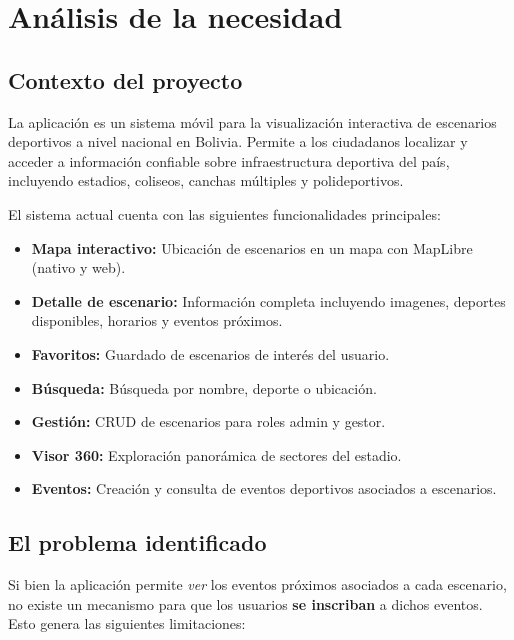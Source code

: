 
\section{An\'alisis de la necesidad}

\subsection{Contexto del proyecto}

La aplicaci\'on \nombreApp{} es un sistema m\'ovil para la
visualizaci\'on interactiva de escenarios deportivos a nivel nacional
en Bolivia. Permite a los ciudadanos localizar y acceder a informaci\'on
confiable sobre infraestructura deportiva del pa\'is, incluyendo
estadios, coliseos, canchas m\'ultiples y polideportivos.

El sistema actual cuenta con las siguientes funcionalidades principales:

\begin{itemize}
  \item \textbf{Mapa interactivo:} Ubicaci\'on de escenarios en un mapa
    con MapLibre (nativo y web).
  \item \textbf{Detalle de escenario:} Informaci\'on completa incluyendo
    imagenes, deportes disponibles, horarios y eventos pr\'oximos.
  \item \textbf{Favoritos:} Guardado de escenarios de inter\'es del
    usuario.
  \item \textbf{B\'usqueda:} B\'usqueda por nombre, deporte o
    ubicaci\'on.
  \item \textbf{Gesti\'on:} CRUD de escenarios para roles admin y gestor.
  \item \textbf{Visor 360:} Exploraci\'on panor\'amica de sectores del
    estadio.
  \item \textbf{Eventos:} Creaci\'on y consulta de eventos deportivos
    asociados a escenarios.
\end{itemize}

\subsection{El problema identificado}

Si bien la aplicaci\'on permite \textit{ver} los eventos pr\'oximos
asociados a cada escenario, no existe un mecanismo para que los
usuarios \textbf{se inscriban} a dichos eventos. Esto genera las
siguientes limitaciones:

